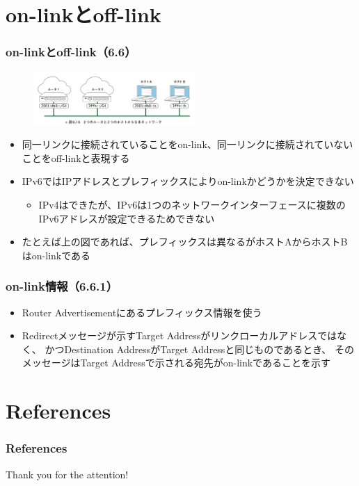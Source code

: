 \section{on-linkとoff-link}

\begin{frame}
  \frametitle{on-linkとoff-link（6.6）}

  \begin{center}
    \begin{figure}
      \includegraphics[width=0.55\textwidth]{img/figure6_16.png}
    \end{figure}
  \end{center}

  \begin{itemize}
    \item 同一リンクに接続されていることをon-link、同一リンクに接続されていないことをoff-linkと表現する

    \item IPv6ではIPアドレスとプレフィックスによりon-linkかどうかを決定できない
    \begin{itemize}
      \item IPv4はできたが、IPv6は1つのネットワークインターフェースに複数のIPv6アドレスが設定できるためできない
    \end{itemize}

    \item たとえば上の図であれば、プレフィックスは異なるがホストAからホストBはon-linkである
  \end{itemize}
\end{frame}

\begin{frame}
  \frametitle{on-link情報（6.6.1）}

  \begin{itemize}
    \item Router Advertisementにあるプレフィックス情報を使う

    \item Redirectメッセージが示すTarget Addressがリンクローカルアドレスではなく、
    かつDestination AddressがTarget Addressと同じものであるとき、
    そのメッセージはTarget Addressで示される宛先がon-linkであることを示す
  \end{itemize}
\end{frame}

\section*{References}
\begin{frame}%
  \frametitle{References}
  
  
\end{frame}

\begin{frame}
  \centering
  {\Huge Thank you for the attention!}
\end{frame}


